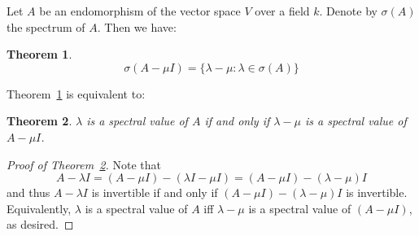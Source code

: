 \documentclass[12pt]{article}
\newtheorem{thm}{Theorem}
\begin{document}
Let $A$ be an endomorphism of the vector space 
$V$ over a field $k$.  Denote by $\sigma(A)$ the spectrum 
of $A$.  Then we have:

\begin{thm}
\label{thm:spec}
\[
    \sigma(A-\mu I)=\{\lambda-\mu\colon \lambda
    \in\sigma(A)\}
\]
\end{thm}

Theorem~\ref{thm:spec} is equivalent to:

\begin{thm}
\label{thm:sp}
$\lambda$ is a spectral value of $A$ if and only if 
$\lambda-\mu$ is a spectral value of $A-\mu I$.
\end{thm}
\begin{proof}[Proof of Theorem~\ref{thm:sp}]
Note that
\[
    A-\lambda I=(A-\mu I)-(\lambda I-\mu I)
    =(A-\mu I)-(\lambda-\mu)I
\]
and thus $A-\lambda I$ is invertible if and only if 
$(A-\mu I)-(\lambda-\mu)I$ is invertible.  Equivalently, 
$\lambda$ is a spectral value of $A$ iff $\lambda-\mu$ is a 
spectral value of $(A-\mu I)$, as desired.
\end{proof}
\end{document}
